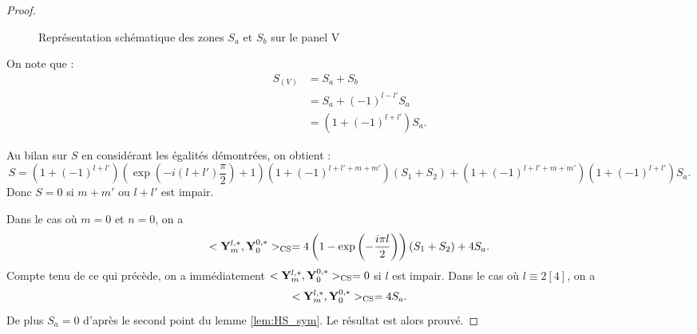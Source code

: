 \begin{proof}
\begin{figure}
\begin{center}
\end{center}
\caption{Représentation schématique des zones $S_a$ et $S_b$ sur le panel V}
\label{fig: zones panel V}
\end{figure}
On note que :
\begin{align*}
S_{(V)} & = S_a + S_b \\
		& = S_a + (-1)^{l-l'}S_a \\
		& = (1 + (-1)^{l+l'})S_a.
\end{align*}

Au bilan sur $S$ en considérant les égalités démontrées, on obtient :
\begin{equation}
S = (1+(-1)^{l+l'})\left( \exp \left( -i(l+l') \dfrac{\pi}{2} \right) +1 \right)(1 +(-1)^{l+l'+m+m'})(S_1+S_2) + (1+(-1)^{l+l'+m+m'})(1 + (-1)^{l+l'})S_a.
\end{equation}
Donc $S=0$ si $m+m'$ ou $l+l'$ est impair.

Dans le cas où $m=0$ et $n=0$, on a
\begin{equation}
<\mathbf{Y}_m^{l,*},\mathbf{Y}_0^{0,*} >_{\text{CS}} = 4 \left( 1- \exp \left(-\dfrac{i \pi l}{2} \right)\right)(S_1+S_2) + 4 S_a.
\end{equation}
Compte tenu de ce qui précède, on a immédiatement $<\mathbf{Y}_m^{l,*},\mathbf{Y}_0^{0,*} >_{\text{CS}} = 0$ si $l$ est impair. Dans le cas où $l \equiv 2 [4]$, on a
\begin{equation}
<\mathbf{Y}_m^{l,*},\mathbf{Y}_0^{0,*} >_{\text{CS}} = 4 S_a.
\end{equation}
De plus $S_a = 0$ d'après le second point du lemme \ref{lem:HS_sym}. Le résultat est alors prouvé. 
\end{proof}

